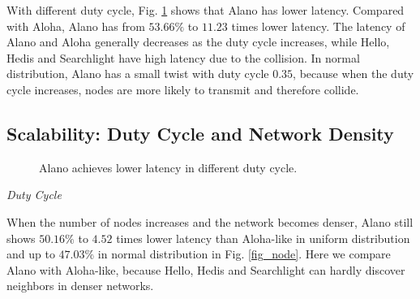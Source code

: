 With different duty cycle, Fig. \ref{fig_dutycycle} shows that Alano has lower latency. Compared with Aloha, Alano has from $53.66\%$ to $11.23$ times lower latency. The latency of Alano and Aloha generally decreases as the duty cycle increases, while Hello, Hedis and Searchlight have high latency due to the collision. In normal distribution, Alano has a small twist with duty cycle $0.35$, because when the duty cycle increases, nodes are more likely to transmit and therefore collide.

\subsection{Scalability: Duty Cycle and Network Density}

\begin{figure}[!h]
\centering
{}
\hspace{0.01in}
\caption{Alano achieves lower latency in different duty cycle.}
\label{fig_dutycycle}
\end{figure}

\emph{Duty Cycle} 




When the number of nodes increases and the network becomes denser, Alano still shows $50.16\%$ to $4.52$ times lower latency than Aloha-like in uniform distribution and up to $47.03\%$ in normal distribution in Fig. \ref{fig_node}. Here we compare Alano with Aloha-like, because Hello, Hedis and Searchlight can hardly discover neighbors in denser networks. 

